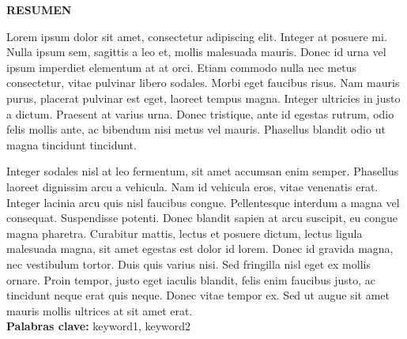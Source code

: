 \begin{center}
\thispagestyle{empty}
\vspace{2cm}
\LARGE{\textbf{RESUMEN}}\\[1.0cm]
\end{center}
\thispagestyle{empty}
Lorem ipsum dolor sit amet, consectetur adipiscing elit. Integer at posuere mi. Nulla ipsum sem, sagittis a leo et, mollis malesuada mauris. Donec id urna vel ipsum imperdiet elementum at at orci. Etiam commodo nulla nec metus consectetur, vitae pulvinar libero sodales. Morbi eget faucibus risus. Nam mauris purus, placerat pulvinar est eget, laoreet tempus magna. Integer ultricies in justo a dictum. Praesent at varius urna. Donec tristique, ante id egestas rutrum, odio felis mollis ante, ac bibendum nisi metus vel mauris. Phasellus blandit odio ut magna tincidunt tincidunt.

Integer sodales nisl at leo fermentum, sit amet accumsan enim semper. Phasellus laoreet dignissim arcu a vehicula. Nam id vehicula eros, vitae venenatis erat. Integer lacinia arcu quis nisl faucibus congue. Pellentesque interdum a magna vel consequat. Suspendisse potenti. Donec blandit sapien at arcu suscipit, eu congue magna pharetra. Curabitur mattis, lectus et posuere dictum, lectus ligula malesuada magna, sit amet egestas est dolor id lorem. Donec id gravida magna, nec vestibulum tortor. Duis quis varius nisi. Sed fringilla nisl eget ex mollis ornare. Proin tempor, justo eget iaculis blandit, felis enim faucibus justo, ac tincidunt neque erat quis neque. Donec vitae tempor ex. Sed ut augue sit amet mauris mollis ultrices at sit amet erat. \\
\textbf{Palabras clave: }keyword1, keyword2